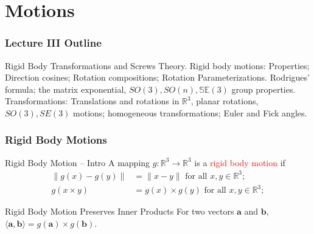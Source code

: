 \section{Motions}
\begin{frame}
	\frametitle{Lecture III Outline}
	\begin{tcolorbox}[coltitle=yellow!50!black,colframe=magenta!25,split=.2,title=Lecture III Outline]
		Rigid Body Transformations and Screws Theory.
		\tcblower
		Rigid body motions: Properties; Direction cosines; Rotation compositions; Rotation Parameterizations.
		\vspace{.2cm}
		\newline
		Rodrigues' formula; the matrix exponential, $SO(3), SO(n), \mathbb{SE}(3)$ group properties.
		\vspace{.2cm}
		\newline
		Transformations: Translations and rotations in $\mathbb{R}^3$, planar rotations, $SO(3), SE(3)$ motions;  homogeneous transformations; Euler and Fick angles.  
	\end{tcolorbox}
\end{frame}


\begin{frame}
	\frametitle{Rigid Body Motions}
	\begin{block}{Rigid Body Motion -- Intro}
		A mapping $g:  \mathbb{R}^3  \rightarrow \mathbb{R}^3$ is a \textcolor{red}{rigid body motion} if 
		\begin{align}
			\|g({x}) - g({y})\| &= \|{x} - {y}\| \text{ for all }  {x}, {y} \in \mathbb{R}^3;  \\
			g({x} \times {y}) &= g(x) \times g({y})\text{ for all }  {x}, {y} \in \mathbb{R}^3; 
		\end{align}
	\end{block}	
	\begin{block}{Rigid Body Motion Preserves Inner Products}
		For two vectors $\bm{a}$ and $\bm{b}$,  $\langle \bm{a},  \bm{b}\rangle =  g(\bm{a}) \times  g(\bm{b})$.
	\end{block}
\end{frame}



